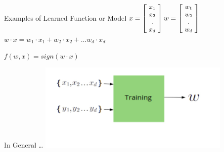 \documentclass[aspectratio=169, 14pt,usenames,dvipsnames]{beamer}
\begin{document}
\begin{frame}[fragile]{Examples of Learned Function or Model}
\centering
$ \small x =  \left[\!
     \begin{array}{c}
      x_1 \\
      x_2 \\
       . \\
      x_{d}
      \end{array} 
      \!\right] w =  \left[\!
    \begin{array}{c}
      w_1 \\
      w_2 \\
       . \\
      w_d
      \end{array} 
	\!\right]$ \\[0.8cm]
$ w\cdot x = w_1 \cdot x_1 + w_2 \cdot x_2 + \ldots w_d \cdot x_d $ \vspace{1pt} \break

	\textbf{\large\textbf{ $ f(w,x) = sign(w \cdot x)$}}

\end{frame}



\begin{frame}{In General \ldots}
\centering
\includegraphics[width=0.7\textwidth,height=0.5\textheight]{Images/deeper_look_19.png} 
\end{frame}
\end{document}
